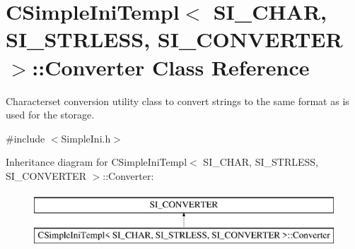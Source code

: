 \hypertarget{class_c_simple_ini_templ_1_1_converter}{}\section{C\+Simple\+Ini\+Templ$<$ S\+I\+\_\+\+C\+H\+AR, S\+I\+\_\+\+S\+T\+R\+L\+E\+SS, S\+I\+\_\+\+C\+O\+N\+V\+E\+R\+T\+ER $>$\+:\+:Converter Class Reference}
\label{class_c_simple_ini_templ_1_1_converter}


Characterset conversion utility class to convert strings to the same format as is used for the storage.  




{\ttfamily \#include $<$Simple\+Ini.\+h$>$}

Inheritance diagram for C\+Simple\+Ini\+Templ$<$ S\+I\+\_\+\+C\+H\+AR, S\+I\+\_\+\+S\+T\+R\+L\+E\+SS, S\+I\+\_\+\+C\+O\+N\+V\+E\+R\+T\+ER $>$\+:\+:Converter\+:\begin{figure}[H]
\begin{center}
\leavevmode
\includegraphics[height=2.000000cm]{class_c_simple_ini_templ_1_1_converter}
\end{center}
\end{figure}
